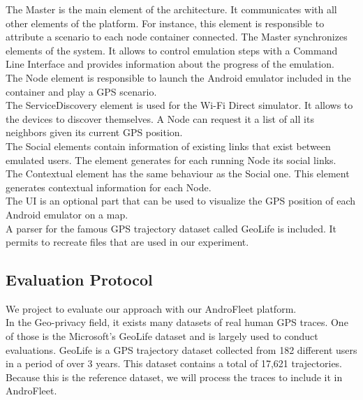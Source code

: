 The Master is the main element of the architecture.
It communicates with all other elements of the platform.
For instance, this element is responsible to attribute a scenario to each node container connected.
The Master synchronizes elements of the system.
It allows to control emulation steps with a Command Line Interface and provides information about the progress of the emulation.
\\

The Node element is responsible to launch the Android emulator included in the container and play a GPS scenario.
\\

The ServiceDiscovery element is used for the Wi-Fi Direct simulator.
It allows to the devices to discover themselves.
A Node can request it a list of all its neighbors given its current GPS position.
\\

The Social elements contain information of existing links that exist between emulated users.
The element generates for each running Node its social links.
\\

The Contextual element has the same behaviour as the Social one.
This element generates contextual information for each Node.
\\

The UI is an optional part that can be used to visualize the GPS position of each Android emulator on a map.
\\

A parser for the famous GPS trajectory dataset called GeoLife is included.
It permits to recreate files that are used in our experiment.
\\

\subsection{Evaluation Protocol}

We project to evaluate our approach with our AndroFleet platform.
\\

In the Geo-privacy field, it exists many datasets of real human GPS traces.
One of those is the Microsoft’s GeoLife dataset and is largely used to conduct evaluations.
GeoLife is a GPS trajectory dataset collected from 182 different users in a period of over 3 years. 
This dataset contains a total of 17,621 trajectories.
Because this is the reference dataset, we will process the traces to include it in AndroFleet.
\\

